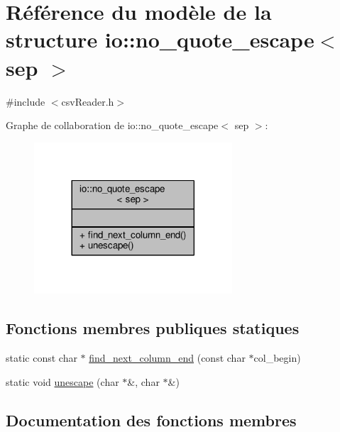 \hypertarget{structio_1_1no__quote__escape}{}\section{Référence du modèle de la structure io\+:\+:no\+\_\+quote\+\_\+escape$<$ sep $>$}
\label{structio_1_1no__quote__escape}


{\ttfamily \#include $<$csv\+Reader.\+h$>$}



Graphe de collaboration de io\+:\+:no\+\_\+quote\+\_\+escape$<$ sep $>$\+:
\nopagebreak
\begin{figure}[H]
\begin{center}
\leavevmode
\includegraphics[width=209pt]{structio_1_1no__quote__escape__coll__graph}
\end{center}
\end{figure}
\subsection*{Fonctions membres publiques statiques}
\begin{DoxyCompactItemize}
\item 
static const char $\ast$ \hyperlink{structio_1_1no__quote__escape_add17b043bb89445079a0448026ce86d0}{find\+\_\+next\+\_\+column\+\_\+end} (const char $\ast$col\+\_\+begin)
\item 
static void \hyperlink{structio_1_1no__quote__escape_af1c217f2c995d178a91c58235191b052}{unescape} (char $\ast$\&, char $\ast$\&)
\end{DoxyCompactItemize}


\subsection{Documentation des fonctions membres}
\mbox{\label{structio_1_1no__quote__escape_add17b043bb89445079a0448026ce86d0}} 
